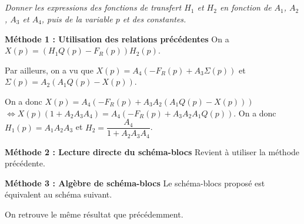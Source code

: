 \documentclass[10pt,fleqn]{article} %
\begin{document}
\begin{multicols}{2}
\fi

\subparagraph{}\textit{Donner les expressions des fonctions de transfert $H_1$
et $H_2$ en fonction de $A_1$, $A_2$, $A_3$ et $A_4$, puis de la variable $p$ et
des constantes.}
\ifprof
\begin{corrige}
\textbf{Méthode 1 : Utilisation des relations précédentes}
On a $X(p)=\left(H_1Q(p)-F_R(p)\right)H_2(p)$. 

Par ailleurs, on a vu que $X(p)=A_4\left(-F_R(p)+A_3\Sigma(p)\right) $ et $\Sigma(p)=A_2\left(A_1Q(p)-X(p)\right)$. 

On a donc $X(p)=A_4\left(-F_R(p)+A_3  A_2\left(A_1Q(p)-X(p)\right)\right) $ $ \Leftrightarrow X(p)\left(1+A_2A_3A_4 \right)=A_4\left(-F_R(p)+A_3  A_2A_1Q(p)\right) $. On a donc 
$H_1(p)=A_1  A_2A_3$ et $H_2 = \dfrac{A_4}{1+ A_2A_3A_4 }$.

\textbf{Méthode 2 : Lecture directe du schéma-blocs}
Revient à utiliser la méthode précédente. 

\textbf{Méthode 3 : Algèbre de schéma-blocs}
Le schéma-blocs proposé est équivalent au schéma suivant. 

\footnotesize
\begin{center}
\end{center}
\normalsize

On retrouve le même résultat que précédemment. 



\end{corrige}
\end{multicols}
\end{document}
